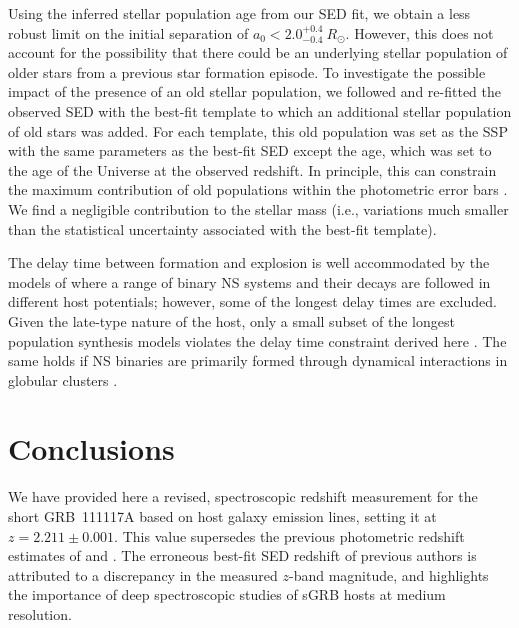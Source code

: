 \documentclass[longauth]{aa}    %
\begin{document}
Using the inferred stellar population age from our SED fit, we obtain a less
robust limit on the initial separation of $a_0 < 2.0^{+0.4}_{-0.4}~R_\odot$.
However, this does not account for the possibility that there could be an underlying
stellar population of older stars from a previous star formation episode. To
investigate the possible impact of the presence of an old stellar population, we
followed \citet{Papovich2001} and re-fitted the observed SED with the best-fit
template to which an additional stellar population of old stars was added. For
each template, this old population was set as the SSP with the same parameters as
the best-fit SED except the age, which was set to the age of the Universe at
the observed redshift. In principle, this can constrain the maximum contribution
of old populations within the photometric error bars \citep[for details, see][]{Papovich2001}. We find a negligible contribution to the stellar mass
(i.e., variations much smaller than the statistical uncertainty associated with
the best-fit template).

The delay time between formation and explosion is well accommodated by the
models of \citet{Belczynski2006} where a range of binary NS systems and their
decays are followed in different host potentials; however, some of the longest delay
times are excluded. Given the late-type nature of the host, only a small
subset of the longest population synthesis models violates the delay time
constraint derived here \citep{OShaughnessy2008}. The same holds if NS binaries
are primarily formed through dynamical interactions in globular clusters
\citep{Lee2010, Church2011}.

\section{Conclusions}

We have  provided here a revised, spectroscopic redshift measurement for the
short GRB~111117A based on host galaxy emission lines, setting it at $z = 2.211
\pm 0.001$. This value supersedes the previous photometric redshift estimates of
\citet{Margutti2012} and \citet{Sakamoto2013}. The erroneous best-fit SED
redshift of previous authors is attributed to a discrepancy in the measured
$z$-band magnitude, and highlights the importance of deep spectroscopic studies
of sGRB hosts at medium resolution.
\end{document}
